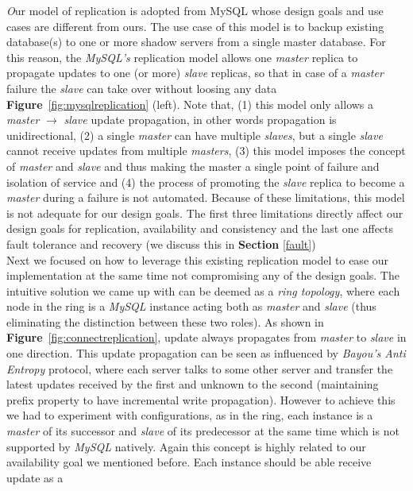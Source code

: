 \documentclass[12pt]{article}
\begin{document}
\emph Our model of replication is adopted from {MySQL} whose design goals and use cases are different from ours. 
The use case of this model is to backup existing database(s) to one or more shadow servers
from a single master database. For this reason, the \emph{MySQL's} replication
model allows one \emph{master} replica to propagate updates to one (or more)
\emph{slave} replicas, so that in case of a \emph{master} failure the
\emph{slave} can take over without loosing any data
\textbf{Figure}~\ref{fig:mysqlreplication} (left). Note that,  (1) this model
only allows a \emph{master} $\rightarrow$ \emph{slave} update propagation, in
other words propagation is unidirectional, (2) a single \emph{master} can have
multiple \emph{slaves}, but a single \emph{slave} cannot receive updates from
multiple \emph{masters}, (3) this model imposes the concept of \emph{master} and
\emph{slave} and thus making the master a single point of failure and isolation
of service and (4) the process of promoting the \emph{slave} replica to become a
\emph{master} during a failure is not automated. Because of these limitations,
this model is not adequate for our design goals. The first three limitations
directly affect our design goals for replication, availability and consistency
and the last one affects fault tolerance and recovery (we discuss this in
\textbf{Section} \ref{fault})\\
Next we focused on how to leverage this existing replication model to ease our implementation at the same time not compromising any of the design goals. The intuitive  solution we came up with can be deemed
as a \emph{ring topology}, where each node in the ring is a \emph{MySQL}
instance acting both as \emph{master} and \emph{slave} (thus eliminating the
distinction between these two roles). As shown in \textbf{Figure}~\ref{fig:connectreplication}, 
update always propagates from \emph{master} to \emph{slave} in one direction. 
This update propagation can be seen as influenced by \emph{Bayou's Anti Entropy} protocol, 
where each server talks to some other server and transfer the latest updates received by the first
and unknown to the second (maintaining prefix property to have incremental write
propagation). However to achieve this we had to experiment with configurations,
as in the ring, each instance is a \emph{master} of its successor and
\emph{slave} of its predecessor at the same time which is not supported by
\emph{MySQL} natively. Again this concept is highly related to our availability
goal we mentioned before. Each instance should be able receive update as a
\end{document}
